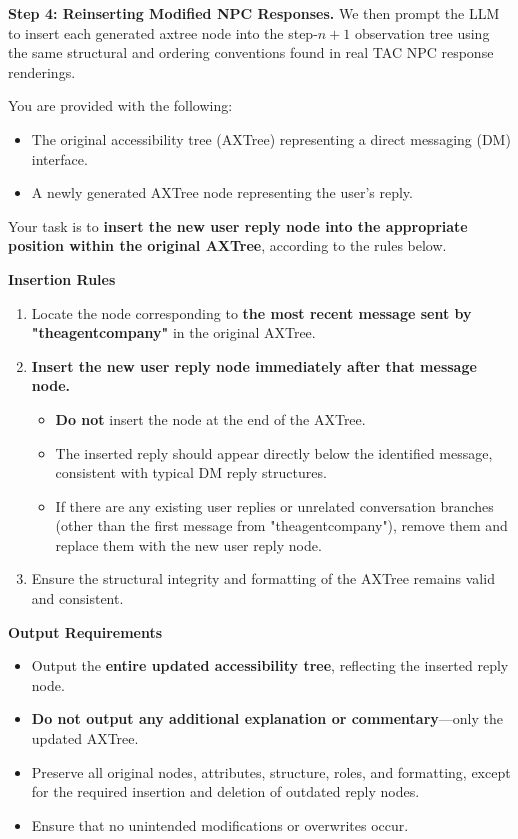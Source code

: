 \textbf{Step 4: Reinserting Modified NPC Responses.}  
We then prompt the LLM to insert each generated axtree node into the step-$n{+}1$ observation tree using the same structural and ordering conventions found in real TAC NPC response renderings.

\begin{promptbox}


You are provided with the following:

\begin{itemize}
  \item The original accessibility tree (AXTree) representing a direct messaging (DM) interface.
  \item A newly generated AXTree node representing the user's reply.
\end{itemize}

Your task is to \textbf{insert the new user reply node into the appropriate position within the original AXTree}, according to the rules below.

\textbf{Insertion Rules}

\begin{enumerate}
  \item Locate the node corresponding to \textbf{the most recent message sent by "theagentcompany"} in the original AXTree.
  \item \textbf{Insert the new user reply node immediately after that message node.}
  \begin{itemize}
    \item \textbf{Do not} insert the node at the end of the AXTree.
    \item The inserted reply should appear directly below the identified message, consistent with typical DM reply structures.
    \item If there are any existing user replies or unrelated conversation branches (other than the first message from "theagentcompany"), remove them and replace them with the new user reply node.
  \end{itemize}
  \item Ensure the structural integrity and formatting of the AXTree remains valid and consistent.
\end{enumerate}

\textbf{Output Requirements}

\begin{itemize}
  \item Output the \textbf{entire updated accessibility tree}, reflecting the inserted reply node.
  \item \textbf{Do not output any additional explanation or commentary}---only the updated AXTree.
  \item Preserve all original nodes, attributes, structure, roles, and formatting, except for the required insertion and deletion of outdated reply nodes.
  \item Ensure that no unintended modifications or overwrites occur.
\end{itemize}


\end{promptbox}
